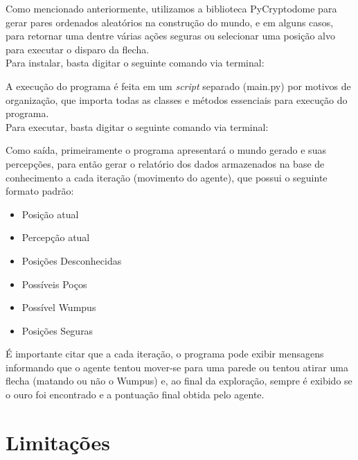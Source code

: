 \documentclass[a4paper, 12pt]{article}
\begin{document}
Como mencionado anteriormente, utilizamos a biblioteca PyCryptodome para gerar pares ordenados aleatórios na construção do mundo, e em alguns casos, para retornar uma dentre várias ações seguras ou selecionar uma posição alvo para executar o disparo da flecha.\\

\noindent Para instalar, basta digitar o seguinte comando via terminal:

\begin{center}
\end{center}

A execução do programa é feita em um \emph{script} separado (main.py) por motivos de organização, que importa todas as classes e métodos essenciais para execução do programa.\\

\noindent Para executar, basta digitar o seguinte comando via terminal:

\begin{center}
\end{center}

Como saída, primeiramente o programa apresentará o mundo gerado e suas percepções, para então gerar o relatório dos dados armazenados na base de conhecimento a cada iteração (movimento do agente), que possui o seguinte formato padrão:

\begin{itemize}
    \item Posição atual
    \item Percepção atual
    \item Posições Desconhecidas
    \item Possíveis Poços
    \item Possível Wumpus
    \item Posições Seguras
\end{itemize}

É importante citar que a cada iteração, o programa pode exibir mensagens informando que o agente tentou mover-se para uma parede ou tentou atirar uma flecha (matando ou não o Wumpus) e, ao final da exploração, sempre é exibido se o ouro foi encontrado e a pontuação final obtida pelo agente.

\section{Limitações}
\end{document}
